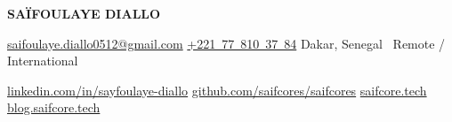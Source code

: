\newcommand{\headlinemaster}{%
  Backend \& Software Architecture \textbullet\
  Distributed Systems \textbullet\
  Banking \& Payments}

\newcommand{\headlinebackend}{%
  Java \textbullet\ Spring Boot \textbullet\
  Distributed Systems \textbullet\ Banking \& Payments}

\newcommand{\headlinearchitecture}{%
  Software Architecture \textbullet\ Distributed Systems \textbullet\
  Enterprise Platforms}

\newcommand{\headlinefintech}{%
  Banking \textbullet\ Payments \textbullet\
  Transaction Processing \textbullet\ Payment Infrastructure}

\newcommand{\headlineinternational}{%
  Backend \& Distributed Systems \textbullet\ Remote}

\newcommand{\jobtitlemaster}{Senior Backend Engineer}
\newcommand{\jobtitlebackend}{Senior Backend Engineer}
\newcommand{\jobtitlearchitecture}{Senior Backend Engineer}
\newcommand{\jobtitlefintech}{Senior Backend Engineer}
\newcommand{\jobtitleinternational}{Senior Backend Engineer}

\begin{center}
    {\LARGE \textbf{SA\"IFOULAYE DIALLO}}

    \vspace{2pt}

    {\large {}}

    \vspace{1pt}

    {\small {}}

    \vspace{3pt}

    {\small
    \href{mailto:saifoulaye.diallo0512@gmail.com}{saifoulaye.diallo0512@gmail.com}
    \quad\textbar\quad
    \href{tel:+221778103784}{+221~77~810~37~84}
    \quad\textbar\quad
    Dakar, Senegal \textbullet\ Remote / International}

    \vspace{1pt}

    {\small
    \href{https://www.linkedin.com/in/sayfoulaye-diallo}{linkedin.com/in/sayfoulaye-diallo}
    \quad\textbar\quad
    \href{https://github.com/saifcores/saifcores}{github.com/saifcores/saifcores}
    \quad\textbar\quad
    \href{https://saifcore.tech}{saifcore.tech}
    \quad\textbar\quad
    \href{https://blog.saifcore.tech}{blog.saifcore.tech}}
\end{center}
